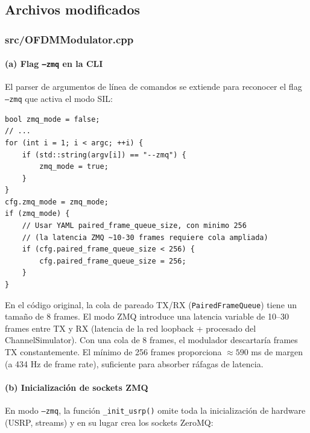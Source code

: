 \documentclass[11pt,a4paper]{article}
\begin{document}
\subsection{Archivos modificados}

\subsubsection{src/OFDMModulator.cpp}

\paragraph{(a) Flag \texttt{--zmq} en la CLI}

El parser de argumentos de línea de comandos se extiende para reconocer el flag \texttt{--zmq}
que activa el modo SIL:

\begin{lstlisting}[style=cpp,
  caption={Detección del flag --zmq — OFDMModulator.cpp}]
bool zmq_mode = false;
// ...
for (int i = 1; i < argc; ++i) {
    if (std::string(argv[i]) == "--zmq") {
        zmq_mode = true;
    }
}
cfg.zmq_mode = zmq_mode;
if (zmq_mode) {
    // Usar YAML paired_frame_queue_size, con minimo 256
    // (la latencia ZMQ ~10-30 frames requiere cola ampliada)
    if (cfg.paired_frame_queue_size < 256) {
        cfg.paired_frame_queue_size = 256;
    }
}
\end{lstlisting}

\begin{infobox}
En el código original, la cola de pareado TX/RX (\texttt{PairedFrameQueue}) tiene un
tamaño de 8 frames. El modo ZMQ introduce una latencia variable de 10–30 frames
entre TX y RX (latencia de la red loopback + procesado del ChannelSimulator). Con una
cola de 8 frames, el modulador descartaría frames TX constantemente. El mínimo de 256
frames proporciona $\approx 590$ ms de margen (a 434 Hz de frame rate), suficiente para
absorber ráfagas de latencia.
\end{infobox}

\paragraph{(b) Inicialización de sockets ZMQ}

En modo \texttt{--zmq}, la función \texttt{\_init\_usrp()} omite toda la inicialización
de hardware (USRP, streams) y en su lugar crea los sockets ZeroMQ:
\end{document}
